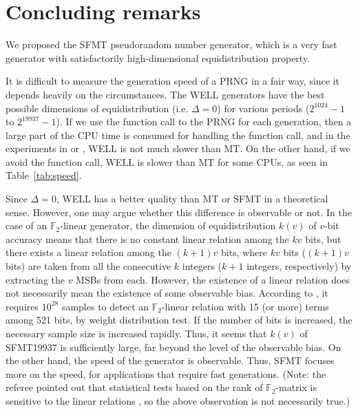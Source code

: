 \documentclass{svmult}
\def\F2{{\mathbb F}_2}
\begin{document}
\section{Concluding remarks}
We proposed the SFMT pseudorandom number generator, 
which is a very fast generator with satisfactorily
high-dimensional equidistribution property. 

It is difficult to measure the generation speed of a PRNG in a fair way,
since it depends heavily on the circumstances. 
The 
WELL \cite{WELL} generators have the best possible dimensions of 
equidistribution (i.e. $\Delta=0$)
for various periods ($2^{1024}-1$ to $2^{19937}-1$).
If we use the function call to the PRNG
for each generation, then a large part of the CPU time
is consumed for handling the function call, and in the 
experiments in \cite{WELL} or \cite{XORSHIFT}, WELL 
is not much slower than MT. On the other hand, if we avoid
the function call, WELL is slower than MT for some CPUs, 
as seen in Table~\ref{tab:speed}. 

Since $\Delta=0$, WELL has a better quality than MT or SFMT
in a theoretical sense. 
However, one may argue whether this difference is 
observable or not. In the case of an $\F2$-linear generator,
the dimension of equidistribution $k(v)$ of $v$-bit accuracy
means that
there is no constant linear relation among the 
$kv$ bits, but there exists a linear relation among
the $(k+1)v$ bits, where $kv$ bits 
($(k+1)v$ bits) are taken from
all the consecutive $k$ integers 
($k+1$ integers, respectively)
by extracting the $v$ MSBs from each.
However, the existence of a linear relation does not necessarily
mean the existence of some observable bias.
According to \cite{TESTWEIGHT}, it requires $10^{28}$
samples to detect an $\F2$-linear relation with 
15 (or more) terms among 521 bits, by weight distribution test. 
If the number of 
bits is increased, 
the necessary sample size is increased rapidly. Thus, it seems
that $k(v)$ of SFMT19937 is sufficiently large, far beyond
the level of the observable bias. 
On the other hand, the speed of the generator is 
observable.
Thus, SFMT focuses more on the speed, for applications
that require fast generations. 
(Note: the referee pointed out that statistical
tests based on the rank of $\F2$-matrix is sensitive to 
the linear relations \cite{TESTU01}, 
so the above observation is not necessarily true.)
\end{document}
